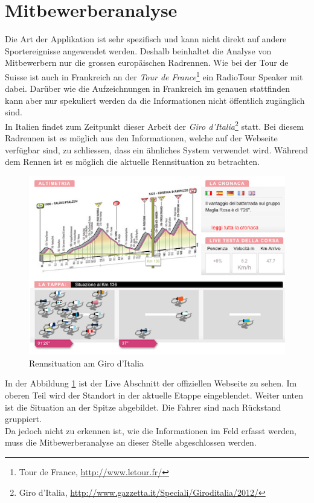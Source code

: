 \section{Mitbewerberanalyse}
Die Art der Applikation ist sehr spezifisch und kann nicht direkt auf andere Sportereignisse angewendet werden. Deshalb beinhaltet die Analyse von Mitbewerbern nur die grossen europäischen Radrennen. Wie bei der Tour de Suisse ist auch in Frankreich an der \textit{Tour de France}\footnote{Tour de France, \url{http://www.letour.fr/}} ein RadioTour Speaker mit dabei. Darüber wie die Aufzeichnungen in Frankreich im genauen stattfinden kann aber nur spekuliert werden da die Informationen nicht öffentlich zugänglich sind.
\\
In Italien findet zum Zeitpunkt dieser Arbeit der \textit{Giro d'Italia}\footnote{Giro d'Italia, \url{http://www.gazzetta.it/Speciali/Giroditalia/2012/}} statt. Bei diesem Radrennen ist es möglich aus den Informationen, welche auf der Webseite verfügbar sind, zu schliessen, dass ein ähnliches System verwendet wird. Während dem Rennen ist es möglich die aktuelle Rennsituation zu betrachten.

\begin{figure}[h!]
\caption{Rennsituation am Giro d'Italia}
\label{fig:giro}
\includegraphics[scale=0.7]{05bericht/images/giro.png}
\end{figure} 

In der Abbildung \ref{fig:giro} ist der Live Abschnitt der offiziellen Webseite zu sehen. Im oberen Teil wird der Standort in der aktuelle Etappe eingeblendet. Weiter unten ist die Situation an der Spitze abgebildet. Die Fahrer sind nach Rückstand gruppiert.
\\
Da jedoch nicht zu erkennen ist, wie die Informationen im Feld erfasst werden, muss die Mitbewerberanalyse an dieser Stelle abgeschlossen werden.